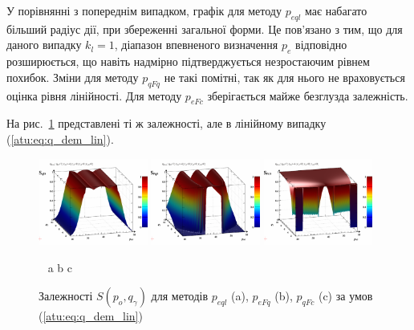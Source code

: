У порівнянні з попереднім випадком, графік для методу
$ p_{eql} $ має набагато більший радіус дії, при збереженні загальної
форми. Це пов'язано з тим, що для даного випадку
$ k_l = 1 $, діапазон впевненого визначення
$ p_e $ відповідно розширюється, що навіть надмірно
підтверджується незростаючим рівнем похибок. Зміни для методу
$ p_{qFq} $ не такі помітні, так як для нього не враховується оцінка
рівня лінійності. Для методу
$ p_{eFc} $ зберігається майже безглузда залежність.

На рис.~\ref{atu:f:qsl_S_po_qg_lin} представлені ті ж залежності,
але в лінійному випадку (\ref{atu:eq:q_dem_lin}).

\begin{figure}[htb!]
  \begin{center}
    \includegraphics[width=0.32\textwidth]{p/qls_pe-p_po_qg_Sql_lin.png}
    \hfill
    \includegraphics[width=0.32\textwidth]{p/qls_pe-p_po_qg_SFq_lin.png}
    \hfill
    \includegraphics[width=0.32\textwidth]{p/qls_pe-p_po_qg_SFc_lin.png}
  \end{center}
  \vspace{-1.0ex}
  \begin{center}
    ~ \hfill a \hfill\hfill b \hfill\hfill c \hfill ~
  \end{center}
  \vspace{-1.5ex}
  \caption{Залежності $S(p_o,q_\gamma)$ для методів $p_{eql}$ (a), $p_{eFq}$ (b), $p_{qFc}$ (c) за умов (\ref{atu:eq:q_dem_lin})}
  \label{atu:f:qsl_S_po_qg_lin}
\end{figure}

